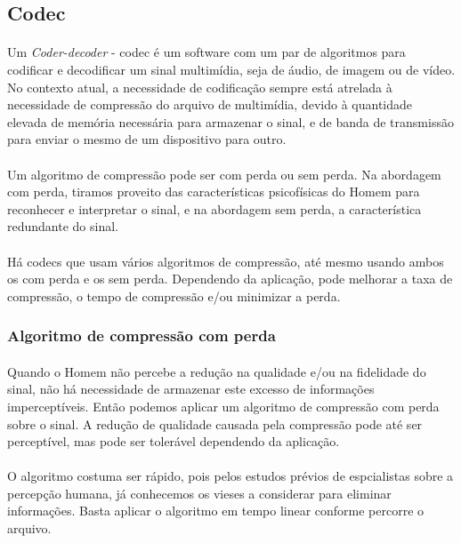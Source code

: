 \documentclass[a4paper,12pt]{article}
\begin{document}
\subsection{Codec}

\paragraph{}
Um \textit{Coder-decoder} - codec é um software com um par de algoritmos para codificar e decodificar um sinal multimídia, seja de áudio, de imagem ou de vídeo. No contexto atual, a necessidade de codificação sempre está atrelada à necessidade de compressão do arquivo de multimídia, devido à quantidade elevada de memória necessária para armazenar o sinal, e de banda de transmissão para enviar o mesmo de um dispositivo para outro.

\paragraph{}
Um algoritmo de compressão pode ser com perda ou sem perda. Na abordagem com perda, tiramos proveito das características psicofísicas do Homem para reconhecer e interpretar o sinal, e na abordagem sem perda, a característica redundante do sinal.

\paragraph{}
Há codecs que usam vários algoritmos de compressão, até mesmo usando ambos os com perda e os sem perda. Dependendo da aplicação, pode melhorar a taxa de compressão, o tempo de compressão e/ou minimizar a perda.

\subsubsection{Algoritmo de compressão com perda}
\paragraph{}
Quando o Homem não percebe a redução na qualidade e/ou na fidelidade do sinal, não há necessidade de armazenar este excesso de informações imperceptíveis. Então podemos aplicar um algoritmo de compressão com perda sobre o sinal.  A redução de qualidade causada pela compressão pode até ser perceptível, mas pode ser tolerável dependendo da aplicação.

\paragraph{}
O algoritmo costuma ser rápido, pois pelos estudos prévios de espcialistas sobre a percepção humana, já conhecemos os vieses a considerar para eliminar informações. Basta aplicar o algoritmo em tempo linear conforme percorre o arquivo.
\end{document}
